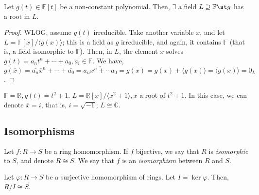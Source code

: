 \documentclass[12pt,oneside]{article}
\begin{document}
\begin{theorem}
  Let $g(t) \in \mathbb{F}[t]$ be a non-constant polynomial. Then, $\exists$ a field $L \supseteq \mathbb{F} \st g$ has a root in $L$.
\end{theorem}

\begin{proof}
  WLOG, assume $g(t)$ irreducible. Take another variable $x$, and let $L = \mathbb{F}[x]/\langle g(x) \rangle$; this is a field as $g$ irreducible, and again, it contains $\mathbb{F}$ (that is, a field isomorphic to $\mathbb{F}$). Then, in $L$, the element $\overline{x}$ solves $g(t) = a_n t^n + \cdots + a_0, a_i \in \mathbb{F}$. We have, $g(\overline{x}) = \overline{a_n} \overline{x}^{n} + \cdots + \overline{a_0} = \overline{a_n x^n + \cdots a_0} = \overline{g(x)} = g(x) + \langle g(x)\rangle = \langle g(x) \rangle = 0_L$.
\end{proof}

\begin{example}
  $\mathbb{F} = \mathbb{R}, g(t) = t^2 + 1.$ $L = \mathbb{R}[x]/\langle x^2+1\rangle, \overline{x}$ a root of $t^2 + 1$. In this case, we can denote $\overline{x} = i$, that is, $i = \sqrt{-1}$; $L \cong \mathbb{C}$.
\end{example}

\subsection{Isomorphisms}

\begin{definition}[Isomorphism]
  Let $f : R \to S$ be a ring homomorphism. If $f$ bijective, we say that $R$ is \emph{isomorphic} to $S$, and denote $R \cong S$. We say that $f$ is an \emph{isomorphism} between $R$ and $S$.
\end{definition}


\begin{theorem}\label{thm:firstiso}
  Let $\varphi: R \to S$ be a surjective homomorphism of rings. Let $I = \ker \varphi$. Then, $R/I \cong S$.
\end{theorem}
\end{document}
